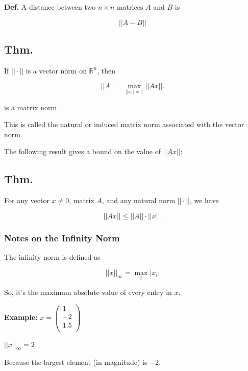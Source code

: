\documentclass[12pt]{article}
\begin{document}
\textbf{Def.} A distance between two $n\times n$ matrices $A$ and $B$ is

\begin{equation*}
  ||A-B||
\end{equation*}

\subsection{Thm.}

If $||\cdot||$ is a vector norm on $\mathbb{R}^n $, then 

\begin{equation*}
  ||A|| = \max_{||x||=1} ||Ax||.
\end{equation*}

is a matrix norm.

This is called the natural or induced matrix norm associated with the vector
norm.

The following result gives a bound on the value of $||Ax||$:

\subsection{Thm.}

For any vector $x\ne 0$, matrix $A$, and any natural norm $||\cdot||$, we have

\begin{equation*}
  ||Ax|| \leq ||A|| \cdot ||x||.
\end{equation*}

\subsubsection{Notes on the Infinity Norm}

The infinity norm is defined as

\begin{equation*}
  ||x||_\infty = \max_{i} |x_i|
\end{equation*}

So, it's the maximum absolute value of every entry in $x$.

\textbf{Example:} $x=\left(\begin{array}{c}
  1 \\
  -2 \\
  1.5 \\
\end{array}\right)$

$||x||_\infty = 2$

Because the largest element (in magnitude) is $-2$.
\end{document}
